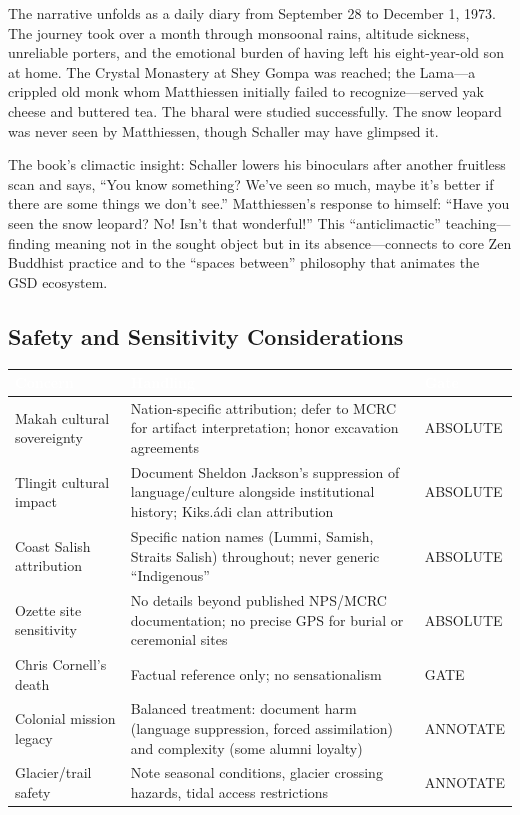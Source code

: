 \documentclass[11pt,letterpaper]{article}
\newcommand{\tableheader}[1]{\textbf{\sffamily\textcolor{white}{#1}}}
\begin{document}
The narrative unfolds as a daily diary from September 28 to December 1, 1973. The journey took over a month through monsoonal rains, altitude sickness, unreliable porters, and the emotional burden of having left his eight-year-old son at home. The Crystal Monastery at Shey Gompa was reached; the Lama---a crippled old monk whom Matthiessen initially failed to recognize---served yak cheese and buttered tea. The bharal were studied successfully. The snow leopard was never seen by Matthiessen, though Schaller may have glimpsed it.

The book's climactic insight: Schaller lowers his binoculars after another fruitless scan and says, ``You know something? We've seen so much, maybe it's better if there are some things we don't see.'' Matthiessen's response to himself: ``Have you seen the snow leopard? No! Isn't that wonderful!'' This ``anticlimactic'' teaching---finding meaning not in the sought object but in its absence---connects to core Zen Buddhist practice and to the ``spaces between'' philosophy that animates the GSD ecosystem.

\subsection{Safety and Sensitivity Considerations}

\begin{center}
\begin{tabularx}{\textwidth}{L{4cm}XC{2cm}}
\toprule
{}
\tableheader{Concern} & \tableheader{Handling} & \tableheader{Gate} \\
\midrule
Makah cultural sovereignty & Nation-specific attribution; defer to MCRC for artifact interpretation; honor excavation agreements & ABSOLUTE \\
Tlingit cultural impact & Document Sheldon Jackson's suppression of language/culture alongside institutional history; Kiks.ádi clan attribution & ABSOLUTE \\
Coast Salish attribution & Specific nation names (Lummi, Samish, Straits Salish) throughout; never generic ``Indigenous'' & ABSOLUTE \\
Ozette site sensitivity & No details beyond published NPS/MCRC documentation; no precise GPS for burial or ceremonial sites & ABSOLUTE \\
Chris Cornell's death & Factual reference only; no sensationalism & GATE \\
Colonial mission legacy & Balanced treatment: document harm (language suppression, forced assimilation) and complexity (some alumni loyalty) & ANNOTATE \\
Glacier/trail safety & Note seasonal conditions, glacier crossing hazards, tidal access restrictions & ANNOTATE \\
\bottomrule
\end{tabularx}
\end{center}
\end{document}
